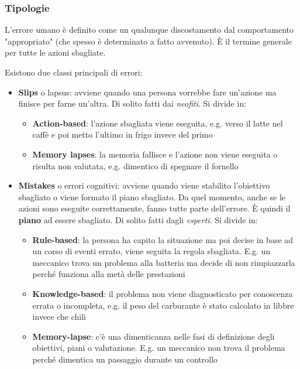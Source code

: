 \newpage
\subsubsection{Tipologie}
\begin{definition}[Errori]
	L'errore umano è definito come un qualunque discostamento dal comportamento "appropriato" (che spesso è determinato a fatto avvenuto). È il termine generale per tutte le azioni sbagliate.
\end{definition}
Esistono due classi principali di errori:
\begin{itemize}
	\item \textbf{Slips} o lapsus: avviene quando una persona vorrebbe fare un'azione ma finisce per farne un'altra. Di solito fatti dai \textit{neofiti}. Si divide in:
	\begin{itemize}
		\item \textbf{Action-based}: l'azione sbagliata viene eseguita, e.g. verso il latte nel caffè e poi metto l'ultimo in frigo invece del primo
		\item \textbf{Memory lapses}: la memoria fallisce e l'azione non viene eseguita o risulta non valutata, e.g. dimentico di spegnare il fornello
	\end{itemize}
	\item \textbf{Mistakes} o errori cognitivi: avviene quando viene stabilito l'obiettivo sbagliato o viene formato il piano sbagliato. Da quel momento, anche se le azioni sono eseguite correttamente, fanno tutte parte dell'errore. È quindi il \textbf{piano} ad essere sbagliato. Di solito fatti dagli \textit{esperti}. Si divide in:
	\begin{itemize}
		\item \textbf{Rule-based}: la persona ha capito la situazione ma poi decise in base ad un corso di eventi errato, viene seguita la regola sbagliata. E.g. un meccanico trova un problema alla batteria ma decide di non rimpiazzarla perché funziona alla metà delle prestazioni
		\item \textbf{Knowledge-based}: il problema non viene diagnosticato per conoscenza errata o incompleta, e.g. il peso del carburante è stato calcolato in libbre invece che chili
		\item \textbf{Memory-lapse}: c'è una dimenticanza nelle fasi di definizione degli obiettivi, piani o valutazione. E.g. un meccanico non trova il problema perché dimentica un passaggio durante un controllo
	\end{itemize}
\end{itemize}

